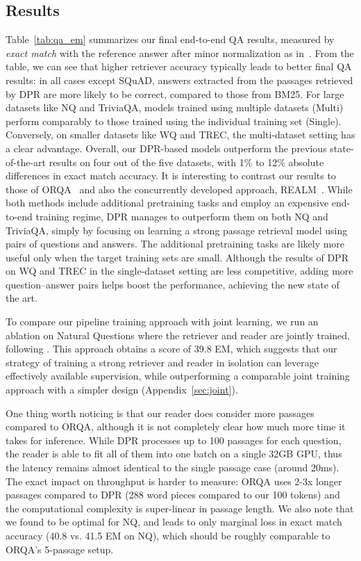 \documentclass[11pt,a4paper]{article}
\def\model/{DPR}
\begin{document}
\subsection{Results}

Table~\ref{tab:qa_em} summarizes our final end-to-end QA results, measured by \emph{exact match} with the reference answer after minor normalization as  in~\cite{chen2017reading,lee2019latent}.  From the table, we can see that higher retriever accuracy typically leads to better final QA results: 
in all cases except SQuAD, answers extracted from the passages retrieved by \model/ are more likely to be correct, compared to those from BM25.
For large datasets like NQ and TriviaQA, models trained using multiple datasets (Multi) perform comparably to those trained using the individual training set (Single).  Conversely, on smaller datasets like WQ and TREC, the multi-dataset setting has a clear advantage. Overall, our \model/-based models outperform the previous state-of-the-art results on four out of the five datasets, with 1\% to 12\% absolute differences in exact match accuracy.
It is interesting to contrast our results to those of ORQA~\cite{lee2019latent} and also the concurrently developed approach, REALM~\cite{guu2020realm}. While both methods include additional pretraining tasks and employ an expensive end-to-end training regime, \model/ manages to outperform them on both NQ and TriviaQA, simply by focusing on learning a strong passage retrieval model using pairs of questions and answers.
The additional pretraining tasks are likely more useful only when the target training sets are small. Although the results of \model/ on WQ and TREC in the single-dataset setting are less competitive, adding more question--answer pairs helps boost the performance, achieving the new state of the art.

To compare our pipeline training approach with joint learning, we run an ablation on Natural Questions where the retriever and reader are jointly trained, following \citet{lee2019latent}.
This approach obtains a score of 39.8 EM, which suggests that our strategy of training a strong retriever and reader in isolation can leverage effectively available supervision, while outperforming a comparable joint training approach with a simpler design (Appendix~\ref{sec:joint}).

One thing worth noticing is that our reader does consider more passages compared to ORQA, although it is not completely clear how much more time it takes for inference. 
While \model/ processes up to 100 passages for each question, the reader is able to fit all of them into one batch on a single 32GB GPU, thus the latency remains almost identical to the single passage case (around 20ms).
The exact impact on throughput is harder to measure: ORQA uses 2-3x longer passages compared to DPR (288 word pieces compared to our 100 tokens) and the computational complexity is super-linear in passage length. We also note that we found  to be optimal for NQ, and  leads to only marginal loss in exact match accuracy (40.8 vs. 41.5 EM on NQ), which should be roughly comparable to ORQA's 5-passage setup.
\end{document}
